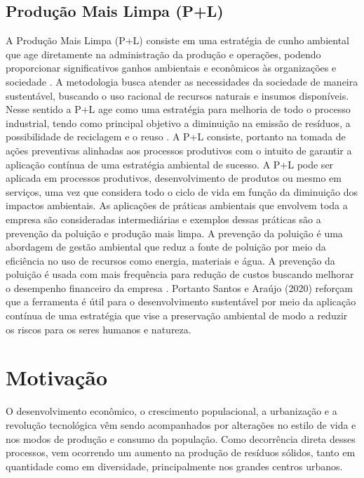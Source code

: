 \documentclass[
	12pt,				%
	openany,			%
	twoside,			%
	a4paper,			%
	english,			%
	french,				%
	spanish,			%
	brazil				%
	]{abntex2}
\begin{document}
\subsection{Produção Mais Limpa (P+L)}
A Produção Mais Limpa (P+L) consiste em uma estratégia de cunho ambiental que age diretamente na administração da produção e operações, podendo proporcionar significativos ganhos ambientais e econômicos às organizações e sociedade \cite{saqf}.
A metodologia busca atender as necessidades da sociedade de maneira sustentável, buscando o uso racional de recursos naturais e insumos disponíveis. Nesse sentido a P+L age como uma estratégia para melhoria de todo o processo industrial, tendo como principal objetivo a diminuição na emissão de resíduos, a possibilidade de reciclagem e o reuso \cite{ascf}. 
A P+L consiste, portanto na tomada de ações preventivas alinhadas aos processos produtivos com o intuito de garantir a aplicação contínua de uma estratégia ambiental de sucesso.  A P+L pode ser aplicada em processos produtivos, desenvolvimento de produtos ou mesmo em serviços, uma vez que considera todo o ciclo de vida em função da diminuição dos impactos ambientais. As aplicações de práticas ambientais que envolvem toda a empresa são consideradas intermediárias e exemplos dessas práticas são a prevenção da poluição e produção mais limpa. A prevenção da poluição é uma abordagem de gestão ambiental que reduz a fonte de poluição por meio da eficiência no uso de recursos como energia, materiais e água. A prevenção da poluição é usada com mais frequência para redução de custos buscando melhorar o desempenho financeiro da empresa \cite{hnpt}.
Portanto Santos e Araújo (2020) reforçam que a ferramenta é útil para o desenvolvimento sustentável por meio da aplicação contínua de uma estratégia que vise a preservação ambiental de modo a reduzir os riscos para os seres humanos e natureza.




\section{Motivação}
O desenvolvimento econômico, o crescimento populacional, a urbanização e a revolução tecnológica vêm sendo acompanhados por alterações no estilo de vida e nos modos de produção e consumo da população. Como decorrência direta desses processos, vem ocorrendo um aumento na produção de resíduos sólidos, tanto em quantidade como em diversidade, principalmente nos grandes centros urbanos. \cite{anjoseferreira}
\end{document}
